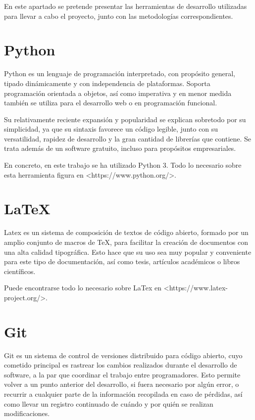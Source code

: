 
En este apartado se pretende presentar las herramientas de desarrollo utilizadas para llevar a cabo el proyecto, junto con las metodologías correspondientes.


\section{Python}

Python es un lenguaje de programación interpretado, con propósito general, tipado dinámicamente y con independencia de plataformas. Soporta programación orientada a objetos, así como imperativa y en menor medida también se utiliza para el desarrollo web o en programación funcional. \cite{python}

Su relativamente reciente expansión y popularidad se explican sobretodo por su simplicidad, ya que su sintaxis favorece un código legible, junto con su versatilidad, rapidez de desarrollo y la gran cantidad de librerías que contiene. Se trata además de un software gratuito, incluso para propósitos empresariales.

En concreto, en este trabajo se ha utilizado Python 3. Todo lo necesario sobre esta herramienta figura en <https://www.python.org/>.


\section{LaTeX}

Latex es un sistema de composición de textos de código abierto, formado por un amplio conjunto de macros de TeX, para facilitar la creación de documentos con una alta calidad tipográfica. Esto hace que su uso sea muy popular y conveniente para este tipo de documentación, así como tesis, artículos académicos o libros científicos. \cite{wiki:latex}

Puede encontrarse todo lo necesario sobre LaTex en <https://www.latex-project.org/>.


\section{Git}

Git es un sistema de control de versiones distribuido para código abierto, cuyo cometido principal es rastrear los cambios realizados durante el desarrollo de software, a la par que coordinar el trabajo entre programadores. Esto permite volver a un punto anterior del desarrollo, si fuera necesario por algún error, o recurrir a cualquier parte de la información recopilada en caso de pérdidas, así como llevar un registro continuado de cuándo y por quién se realizan modificaciones. \cite{wiki:git}

